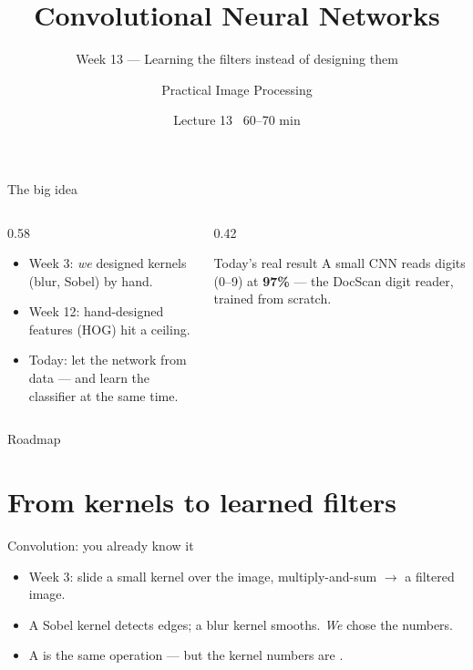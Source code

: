 \documentclass[10pt,aspectratio=169]{beamer}
\title{Convolutional Neural Networks}
\subtitle{Week 13 — Learning the filters instead of designing them}
\author{Practical Image Processing}
\date{Lecture 13 \textbullet\ 60--70 min}
\begin{document}
\maketitle

\begin{frame}{The big idea}
  \begin{columns}[T]
    \begin{column}{0.58\textwidth}
      \begin{itemize}
        \item Week 3: \emph{we} designed kernels (blur, Sobel) by hand.
        \item Week 12: hand-designed features (HOG) hit a ceiling.
        \item \alert{Today:} let the network  from data — and learn the classifier at the same time.
      \end{itemize}
    \end{column}
    \begin{column}{0.42\textwidth}
      \begin{alertblock}{Today's real result}
        A small CNN reads digits (0--9) at \textbf{97\%} — the DocScan digit reader, trained from scratch.
      \end{alertblock}
    \end{column}
  \end{columns}
\end{frame}

\begin{frame}{Roadmap}\tableofcontents\end{frame}

\section{From kernels to learned filters}

\begin{frame}{Convolution: you already know it}
  \begin{itemize}
    \item Week 3: slide a small kernel over the image, multiply-and-sum $\rightarrow$ a filtered image.
    \item A Sobel kernel detects edges; a blur kernel smooths. \emph{We} chose the numbers.
    \item A  is the same operation — but the kernel numbers are .
  \end{itemize}
\end{frame}
\end{document}
